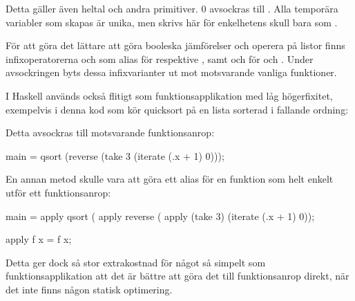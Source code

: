 \documentclass[../Core]{subfiles}
\begin{document}
Detta gäller även heltal och andra primitiver. $0$ avsockras till
. Alla temporära variabler som skapas är unika, men skrivs här för enkelhetens
skull bara som .
            
    
För att göra det lättare att göra booleska jämförelser och operera på listor
 finns infixoperatorerna \ic{\&\&} och \ic{||} som alias för  respektive ,
samt \ic{++} och \ic{:} för  och . Under avsockringen byts dessa
infixvarianter ut mot motsvarande vanliga funktioner. 


I Haskell används också \ic{\$} flitigt som funktionsapplikation med låg
högerfixitet, exempelvis i denna kod som kör quicksort på en
lista sorterad i fallande ordning:


Detta avsockras till motsvarande funktionsanrop:

\begin{codeEx}
main = qsort (reverse (take 3 (iterate (\x.x + 1) 0)));
\end{codeEx}

En annan metod skulle vara att göra \ic{\$} ett alias för en funktion  som
helt enkelt utför ett funktionsanrop:

\begin{codeEx}
main = apply qsort 
     ( apply reverse 
     ( apply (take 3) (iterate (\x.x + 1) 0));

apply f x = f x;
\end{codeEx}

Detta ger dock så stor extrakostnad för något så simpelt som funktionsapplikation
att det är bättre att göra det till funktionsanrop direkt, när det inte finns
någon statisk optimering.
        


\end{document}
